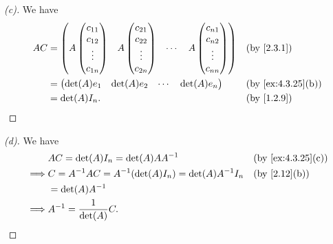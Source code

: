 \begin{proof}[(c)]
	We have
	\begin{align*}
		AC & = \begin{pmatrix}
			       A \begin{pmatrix}
				  c_{1 1} \\
				  c_{1 2} \\
				  \vdots  \\
				  c_{1 n}
			  \end{pmatrix} & A \begin{pmatrix}
				                    c_{2 1} \\
				                    c_{2 2} \\
				                    \vdots  \\
				                    c_{2 n}
			                    \end{pmatrix} & \cdots & A \begin{pmatrix}
				                                               c_{n 1} \\
				                                               c_{n 2} \\
				                                               \vdots  \\
				                                               c_{n n}
			                                               \end{pmatrix}
		       \end{pmatrix} &  & \by{2.3.1}                \\
		   & = \begin{pmatrix}
			       \det(A) e_1 & \det(A) e_2 & \cdots & \det(A) e_n
		       \end{pmatrix}                                                   &  & \by{ex:4.3.25}[b]                            \\
		   & = \det(A) I_n.                                                                                      &  & \by{1.2.9}
	\end{align*}
\end{proof}

\begin{proof}[(d)]
	We have
	\begin{align*}
		         & AC = \det(A) I_n = \det(A) A A^{-1}                       &  & \by{ex:4.3.25}[c] \\
		\implies & C = A^{-1} AC = A^{-1} (\det(A) I_n) = \det(A) A^{-1} I_n &  & \by{2.12}[b]      \\
		         & = \det(A) A^{-1}                                                                 \\
		\implies & A^{-1} = \frac{1}{\det(A)} C.
	\end{align*}
\end{proof}

